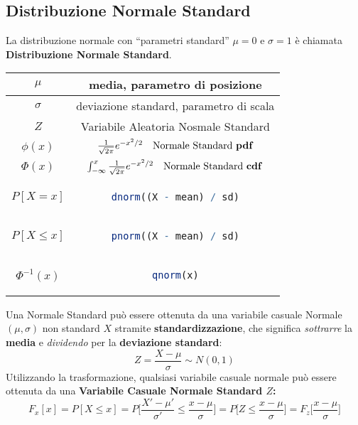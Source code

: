 \subsection{Distribuzione Normale Standard}
\begin{tcolorbox}
La distribuzione normale con “parametri standard” \(\mu = 0\) e \(\sigma = 1\) è chiamata \textbf{Distribuzione Normale Standard}.
\end{tcolorbox}
\begingroup
\setlength{\tabcolsep}{10pt} %
\renewcommand{\arraystretch}{1.5} %
\begin{center}
\begin{tabular}{ |c|c| } 
\hline
\(\mu\) & media, parametro di posizione \\ \hline
\(\sigma\) &  deviazione standard, parametro di scala \\ \hline
\(Z\) & Variabile Aleatoria Nosmale Standard \\ \hline
\(\phi(x)\) & $\frac{1}{\sqrt{2\pi}}e^{-x^2/2} \quad\text{Normale Standard \textbf{pdf}}$ \\ \hline
\(\Phi(x)\) & $\int_{-\infty}^{x} \frac{1}{\sqrt{2\pi}}e^{-x^2/2} \quad\text{Normale Standard \textbf{cdf}}$ \\ \hline\hline
\(P[X = x]\) & \begin{lstlisting}[language=R]
dnorm((X - mean) / sd)
\end{lstlisting} \\ \hline
\(P[X \leq x]\) & \begin{lstlisting}[language=R]
pnorm((X - mean) / sd)
\end{lstlisting} \\ \hline
\(\Phi^{-1}(x)\) & \begin{lstlisting}[language=R]
qnorm(x)
\end{lstlisting} \\ \hline
\end{tabular}
\end{center}
\endgroup
Una Normale Standard può essere ottenuta da una variabile casuale Normale\((\mu, \sigma)\) non standard \(X\) stramite \textbf{standardizzazione}, che significa \textit{sottrarre} la \textbf{media} e \textit{dividendo} per la \textbf{deviazione standard}:
\[Z = \frac{X - \mu}{\sigma} \sim N(0,1)\]
Utilizzando la trasformazione, qualsiasi variabile casuale normale può essere ottenuta da una \textbf{Variabile Casuale Normale Standard \(Z\):}
\[F_x[x] = P[X \leq x] = P\Big[\frac{X' - \mu'}{\sigma'} \leq \frac{x - \mu}{\sigma}\Big] = P\Big[Z \leq \frac{x - \mu}{\sigma}\Big] = F_z\Big[\frac{x - \mu}{\sigma}\Big]\]

